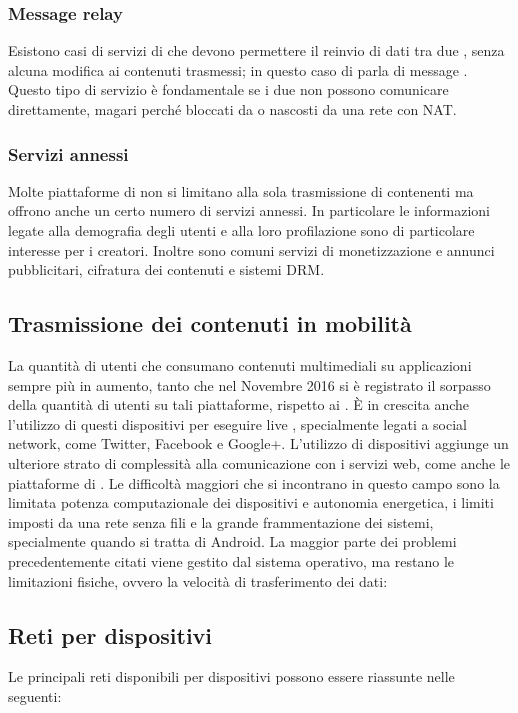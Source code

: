 		\subsubsection{Message relay}
			Esistono casi di servizi di  che devono permettere il reinvio di dati tra due , senza alcuna modifica ai contenuti trasmessi; in questo caso di parla di message . Questo tipo di servizio è fondamentale se i due  non possono comunicare direttamente, magari perché bloccati da  o nascosti da una rete con \gls{NAT}.\@

		\subsubsection{Servizi annessi}
			Molte piattaforme di  non si limitano alla sola trasmissione di contenenti ma offrono anche un certo numero di servizi annessi. In particolare le informazioni legate alla demografia degli utenti e alla loro profilazione sono di particolare interesse per i creatori. Inoltre sono comuni servizi di monetizzazione e annunci pubblicitari, cifratura dei contenuti e sistemi \gls{DRM}.\@


	\subsection{Trasmissione dei contenuti in mobilità}
			La quantità di utenti che consumano contenuti multimediali su applicazioni  sempre più in aumento, tanto che nel Novembre 2016 si è registrato il sorpasso della quantità di utenti su tali piattaforme, rispetto ai \cite{mobiledesktopusage}. È in crescita anche l'utilizzo di questi dispositivi per eseguire live , specialmente legati a social network, come Twitter, Facebook e Google+.
			L'utilizzo di dispositivi  aggiunge un ulteriore strato di complessità alla comunicazione con i servizi web, come anche le piattaforme di .
			Le difficoltà maggiori che si incontrano in questo campo sono la limitata potenza computazionale dei dispositivi e autonomia energetica, i limiti imposti da una rete senza fili e la grande frammentazione dei sistemi, specialmente quando si tratta di Android.
			La maggior parte dei problemi precedentemente citati viene gestito dal sistema operativo, ma restano le limitazioni fisiche, ovvero la velocità di trasferimento dei dati:
	\subsection{Reti per dispositivi }
			Le principali reti disponibili per dispositivi  possono essere riassunte nelle seguenti:
